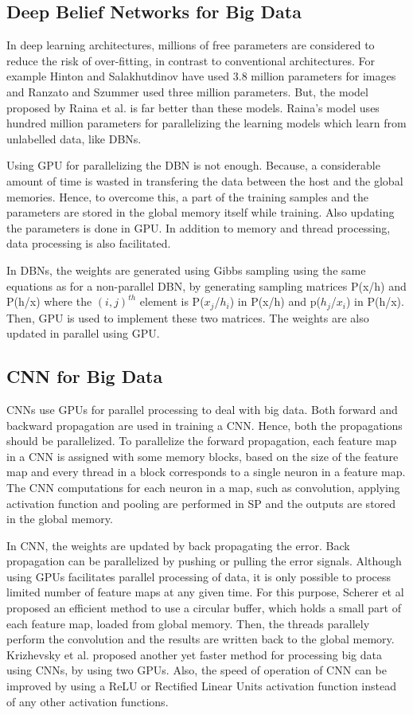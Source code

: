 \documentclass[sigconf]{acmart}
\begin{document}
\subsection{Deep Belief Networks for Big Data}
In deep learning architectures, millions of free parameters are considered to reduce the risk of over-fitting, in contrast to conventional architectures. For example Hinton and Salakhutdinov\cite{Hinton2006a} have used 3.8 million parameters for images and Ranzato and Szummer\cite{Ranzato2008} used three million parameters. But, the model proposed by Raina et al.\cite{2009} is far better than these models. Raina's model uses hundred million parameters for parallelizing the learning models which learn from unlabelled data, like DBNs.

Using GPU for parallelizing the DBN is not enough. Because, a considerable amount of time is wasted in transfering the data between the host and the global memories. Hence, to overcome this, a part of the training samples and the parameters are stored in the global memory itself while training. Also updating the parameters is done in GPU. In addition to memory and thread processing, data processing is also facilitated.

In DBNs, the weights are generated using Gibbs sampling using the same equations as for a non-parallel DBN, by generating sampling matrices P(x/h) and P(h/x) where the $(i,j)^{th}$ element is P($x_j$/$h_i$) in P(x/h) and p($h_j$/$x_i$) in P(h/x). Then, GPU is used to implement these two matrices. The weights are also updated in parallel using GPU.

\subsection{CNN for Big Data}
CNNs use GPUs for parallel processing to deal with big data. Both forward and backward propagation are used in training a CNN. Hence, both the propagations should be parallelized. To parallelize the forward propagation, each feature map in a CNN is assigned with some memory blocks, based on the size of the feature map and every thread in a block corresponds to a single neuron in a feature map. The CNN computations for each neuron in a map, such as convolution, applying activation function and pooling are performed in SP and the outputs are stored in the global memory.

In CNN, the weights are updated by back propagating the error. Back propagation can be parallelized by pushing or pulling the error signals. Although using GPUs facilitates parallel processing of data, it is only possible to process limited number of feature maps at any given time. For this purpose, Scherer et al\cite{2010} proposed an efficient method to use a circular buffer, which holds a small part of each feature map, loaded from global memory. Then, the threads parallely perform the convolution and the results are written back to the global memory. Krizhevsky et al.\cite{2012} proposed another yet faster method for processing big data using CNNs, by using two GPUs. Also, the speed of operation of CNN can be improved by using a ReLU or Rectified Linear Units activation function instead of any other activation functions.
\end{document}

